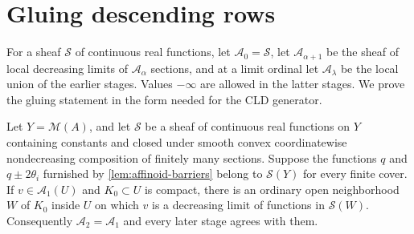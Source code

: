 \documentclass[11pt,a4paper]{amsart}
\begin{document}
\section{Gluing descending rows}
\label{sec:gluing}

For a sheaf $\mathscr{S}$ of continuous real functions, let $\mathscr{A}_0=\mathscr{S}$, let $\mathscr{A}_{\alpha+1}$ be the sheaf of local decreasing limits of $\mathscr{A}_\alpha$ sections, and at a limit ordinal let $\mathscr{A}_\lambda$ be the local union of the earlier stages. Values $-\infty$ are allowed in the latter stages. We prove the gluing statement in the form needed for the CLD generator.

\begin{proposition}
\label{prop:affinoid-gluing}
Let $Y=\mathcal{M}(A)$, and let $\mathscr{S}$ be a sheaf of continuous real functions on $Y$ containing constants and closed under smooth convex coordinatewise nondecreasing composition of finitely many sections. Suppose the functions $q$ and $q\pm2\theta_i$ furnished by \cref{lem:affinoid-barriers} belong to $\mathscr{S}(Y)$ for every finite cover. If $v\in\mathscr{A}_1(U)$ and $K_0\subset U$ is compact, there is an ordinary open neighborhood $W$ of $K_0$ inside $U$ on which $v$ is a decreasing limit of functions in $\mathscr{S}(W)$. Consequently $\mathscr{A}_2=\mathscr{A}_1$ and every later stage agrees with them.
\end{proposition}
\end{document}
